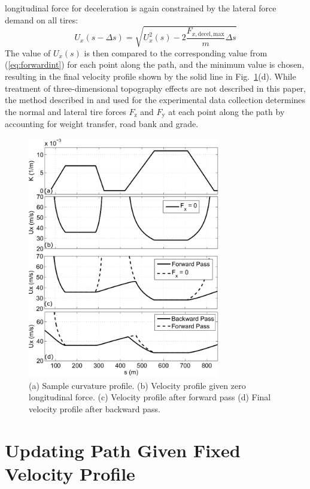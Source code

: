 \documentclass[twocolumn,10pt]{asme2ej}
\begin{document}
longitudinal force for deceleration is again constrained by the lateral force demand on all tires:
\begin{equation}
\label{eq:backwardsint}
	U_x(s-\Delta s) = \sqrt{U^2_x(s)-\mathrm{2}\frac{F_{x,\mathrm{decel,max}}}{m}\Delta s}
\end{equation}
The value of $U_x(s)$ is then compared to the corresponding value from (\ref{eq:forwardint}) for each point along the path, and the minimum
value is chosen, resulting in the final velocity profile shown by the solid line in Fig.~\ref{fig:VPgen}(d). While treatment of three-dimensional topography 
effects are not described in this paper, the method described in \cite{subosits} and
used for the experimental data collection determines the normal and lateral tire forces $F_\mathrm{z}$ and $F_\mathrm{y}$ at each point along the path 
by accounting for weight transfer, road bank and grade. 

 \begin{figure}
\centering
\includegraphics[width=3.3in]{figures/vpgen.eps}
\caption{(a) Sample curvature profile. (b) Velocity profile given zero longitudinal force. (c) Velocity profile after forward pass (d) Final velocity profile after backward pass. }
\label{fig:VPgen}
\end{figure}

\section{Updating Path Given Fixed Velocity Profile}
\label{sec:UPDATE}
\end{document}

